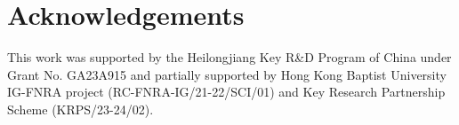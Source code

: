 \section*{Acknowledgements}
This work was supported by the Heilongjiang Key R\&D Program of China under Grant No. GA23A915 and partially supported by Hong Kong Baptist University IG-FNRA project (RC-FNRA-IG/21-22/SCI/01) and Key Research Partnership Scheme (KRPS/23-24/02).